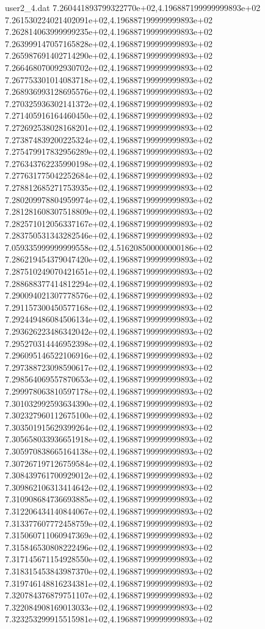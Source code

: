 \begin{filecontents}{user2_4.dat}
7.260441893799322770e+02,4.196887199999999893e+02
7.261530224021402091e+02,4.196887199999999893e+02
7.262814063999999235e+02,4.196887199999999893e+02
7.263999147057165828e+02,4.196887199999999893e+02
7.265987691402714290e+02,4.196887199999999893e+02
7.266468070092930702e+02,4.196887199999999893e+02
7.267753301014083718e+02,4.196887199999999893e+02
7.268936993128695576e+02,4.196887199999999893e+02
7.270325936302141372e+02,4.196887199999999893e+02
7.271405916164460450e+02,4.196887199999999893e+02
7.272692538028168201e+02,4.196887199999999893e+02
7.273874839200225324e+02,4.196887199999999893e+02
7.275479917832956289e+02,4.196887199999999893e+02
7.276343762235990198e+02,4.196887199999999893e+02
7.277631775042252684e+02,4.196887199999999893e+02
7.278812685271753935e+02,4.196887199999999893e+02
7.280209978804959974e+02,4.196887199999999893e+02
7.281281608307518809e+02,4.196887199999999893e+02
7.282571012056337167e+02,4.196887199999999893e+02
7.283750531343282546e+02,4.196887199999999893e+02
7.059335999999999558e+02,4.516208500000000186e+02
7.286219454379047420e+02,4.196887199999999893e+02
7.287510249070421651e+02,4.196887199999999893e+02
7.288688377414812294e+02,4.196887199999999893e+02
7.290094021307778576e+02,4.196887199999999893e+02
7.291157300450577168e+02,4.196887199999999893e+02
7.292449486084506134e+02,4.196887199999999893e+02
7.293626223486342042e+02,4.196887199999999893e+02
7.295270314446952398e+02,4.196887199999999893e+02
7.296095146522106916e+02,4.196887199999999893e+02
7.297388723098590617e+02,4.196887199999999893e+02
7.298564069557870653e+02,4.196887199999999893e+02
7.299978063810597178e+02,4.196887199999999893e+02
7.301032992593634390e+02,4.196887199999999893e+02
7.302327960112675100e+02,4.196887199999999893e+02
7.303501915629399264e+02,4.196887199999999893e+02
7.305658033936651918e+02,4.196887199999999893e+02
7.305970838665164138e+02,4.196887199999999893e+02
7.307267197126759584e+02,4.196887199999999893e+02
7.308439761700929012e+02,4.196887199999999893e+02
7.309862106313414642e+02,4.196887199999999893e+02
7.310908684736693885e+02,4.196887199999999893e+02
7.312206434140844067e+02,4.196887199999999893e+02
7.313377607772458759e+02,4.196887199999999893e+02
7.315060711060947369e+02,4.196887199999999893e+02
7.315846530808222496e+02,4.196887199999999893e+02
7.317145671154928550e+02,4.196887199999999893e+02
7.318315453843987370e+02,4.196887199999999893e+02
7.319746148816234381e+02,4.196887199999999893e+02
7.320784376879751107e+02,4.196887199999999893e+02
7.322084908169013033e+02,4.196887199999999893e+02
7.323253299915515981e+02,4.196887199999999893e+02

\end{filecontents}
